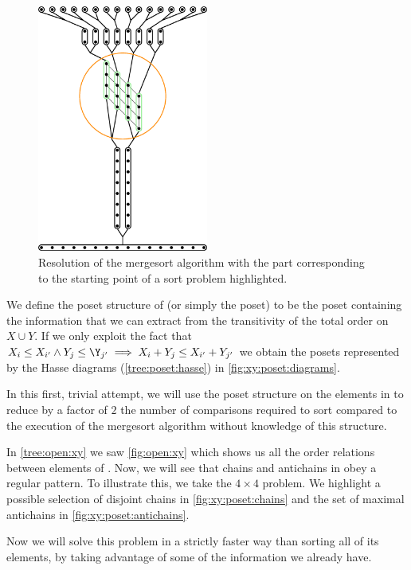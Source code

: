 \begin{figure}
\centering
\includegraphics[width=0.5\textwidth,angle=90]{fig/x+y/poset/mergexy}
\caption{Resolution of the mergesort algorithm with the part
corresponding to the starting point of a sort \XY problem highlighted.}
\label{fig:xy:poset:mergexy}
\end{figure}

We define the poset structure of \XY (or simply the \XY poset) to be the poset
containing the information that we can extract from the transitivity of the
total order on \(X \cup Y\). If we only exploit the fact that
\(X_i \le X_{i'} \land Y_j \le \Y_{j'} \implies X_i + Y_j \le X_{i'} + Y_{j'}\)
we obtain the posets represented by the Hasse diagrams (\ref{tree:poset:hasse})
in \ref{fig:xy:poset:diagrams}.

In this first, trivial attempt, we will use the poset structure on the elements
in \XY to reduce by a factor of $2$ the number of comparisons
required to sort \XY compared to the execution of the mergesort algorithm
without knowledge of this structure.

In \ref{tree:open:xy} we saw \ref{fig:open:xy} which shows us all the order
relations between elements of \XY. Now, we will see that chains and antichains
in \XY obey a regular pattern. To illustrate this, we take the $4 \times 4$
\XY problem. We highlight a possible selection of disjoint chains in
\ref{fig:xy:poset:chains} and the set of maximal antichains in
\ref{fig:xy:poset:antichains}.

Now we will solve this problem in a strictly faster way than sorting all
of its elements, by taking advantage of some of the information we already have.

